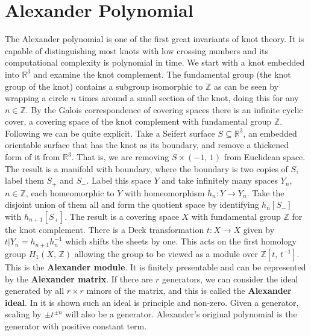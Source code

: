 \section{Alexander Polynomial}
    The Alexander polynomial is one of the first great invariants of knot theory.
    It is capable of distinguishing most knots with low crossing numbers and
    its computational complexity is polynomial in time. We start with a
    knot embedded into $\mathbb{R}^{3}$ and examine the knot complement.
    The fundamental group (the knot group of the knot) contains a subgroup
    isomorphic to $\mathbb{Z}$ as can be seen by wrapping a circle $n$ times
    around a small section of the knot, doing this for any $n\in\mathbb{Z}$.
    By the Galois correspondence of covering spaces
    \cite[Sec.~1.3]{HatcherAlgTop} there is an infinite cyclic cover,
    a covering space of the knot complement with fundamental group
    $\mathbb{Z}$. Following \cite[p.~53]{LickorishKnotTheory} we can be quite
    explicit. Take a Seifert surface $S\subseteq\mathbb{R}^{3}$, an embedded
    orientable surface that has the knot as its boundary, and remove a
    thickened form of it from $\mathbb{R}^{3}$. That is, we are removing
    $S\times(-1,\,1)$ from Euclidean space. The result is a manifold with
    boundary, where the boundary is two copies of $S$, label them $S_{+}$ and
    $S_{-}$. Label this space $Y$ and take infinitely many spaces $Y_{n}$,
    $n\in\mathbb{Z}$, each homeomorphic to $Y$ with homeomorphism
    $h_{n}:Y\rightarrow{Y}_{n}$. Take the disjoint union of them all and
    form the quotient space by identifying $h_{n}[S_{-}]$ with $h_{n+1}[S_{+}]$.
    The result is a covering space $X$ with fundamental group $\mathbb{Z}$
    for the knot complement. There is a Deck transformation
    $t:X\rightarrow{X}$ given by $t|Y_{n}=h_{n+1}h_{n}^{-1}$ which
    shifts the sheets by one. This acts on the first homology group
    $H_{1}(X,\,\mathbb{Z})$ allowing the group to be viewed as a
    module over $\mathbb{Z}[t,\,t^{-1}]$. This is the
    \textbf{Alexander module}. It is finitely presentable and can be
    represented by the \textbf{Alexander matrix}. If there are $r$ generators,
    we can consider the ideal generated by all $r\times{r}$ minors of the
    matrix, and this is called the \textbf{Alexander ideal}. In
    \cite{AlexanderTopologicalInvariants} it is shown such an ideal is
    principle and non-zero. Given a generator, scaling by $\pm{t}^{\pm{n}}$ will
    also be a generator. Alexander's original polynomial is the generator with
    positive constant term.
    \par\hfill\par
